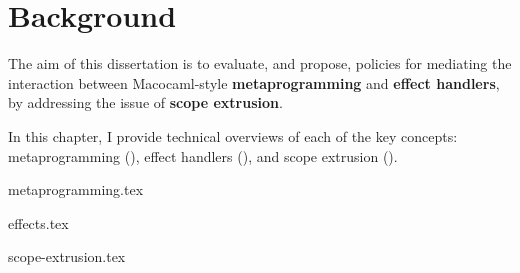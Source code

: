 \chapter{Background}
The aim of this dissertation is to evaluate, and propose, policies for mediating the interaction between Macocaml-style \textbf{metaprogramming} and \textbf{effect handlers}, by addressing the issue of \textbf{scope extrusion}.

In this chapter, I provide technical overviews of each of the key concepts: metaprogramming (), effect handlers (), and scope extrusion ().

{metaprogramming.tex}

{effects.tex}

{scope-extrusion.tex}
